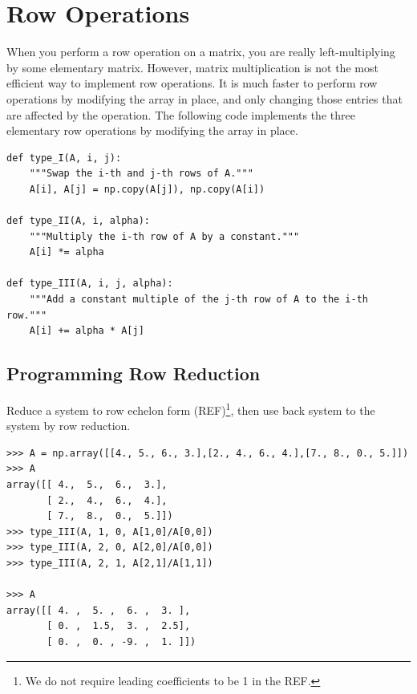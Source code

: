 
\section*{Row Operations} %

When you perform a row operation on a matrix, you are really left-multiplying by some elementary matrix.
However, matrix multiplication is not the most efficient way to implement row operations. It is much faster to perform row operations by modifying the array in place, and only changing those entries that are affected by the operation.
The following code implements the three elementary row operations by modifying the array in place.

\begin{lstlisting}
def type_I(A, i, j):
    """Swap the i-th and j-th rows of A."""
    A[i], A[j] = np.copy(A[j]), np.copy(A[i])

def type_II(A, i, alpha):
    """Multiply the i-th row of A by a constant."""
    A[i] *= alpha

def type_III(A, i, j, alpha):
    """Add a constant multiple of the j-th row of A to the i-th row."""
    A[i] += alpha * A[j]
\end{lstlisting}

\subsection*{Programming Row Reduction} %

Reduce a system to row echelon form (REF)\footnote{We do not require leading coefficients to be 1 in the REF.}, then use back system to the system by row reduction.

\begin{lstlisting}
>>> A = np.array([[4., 5., 6., 3.],[2., 4., 6., 4.],[7., 8., 0., 5.]])
>>> A
array([[ 4.,  5.,  6.,  3.],
       [ 2.,  4.,  6.,  4.],
       [ 7.,  8.,  0.,  5.]])
>>> type_III(A, 1, 0, A[1,0]/A[0,0])
>>> type_III(A, 2, 0, A[2,0]/A[0,0])
>>> type_III(A, 2, 1, A[2,1]/A[1,1])

>>> A
array([[ 4. ,  5. ,  6. ,  3. ],
       [ 0. ,  1.5,  3. ,  2.5],
       [ 0. ,  0. , -9. ,  1. ]])
\end{lstlisting}

